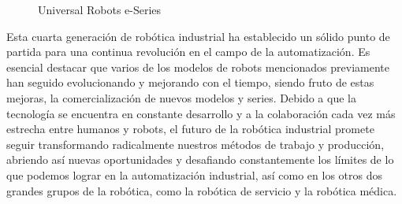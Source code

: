   \begin{figure}[H]
    \begin{center}
      \subcapcentertrue
      \hspace{2mm}
    \end{center}
    \caption{Universal Robots e-Series}
    \label{fig:UR_e-Series}
  \end{figure}

\pagebreak
Esta cuarta generación de robótica industrial ha establecido un sólido punto de partida para una continua revolución en el campo de la automatización. 
Es esencial destacar que varios de los modelos de robots mencionados previamente han seguido evolucionando y mejorando con el tiempo, siendo fruto de estas mejoras, la comercialización de nuevos modelos y series. 
Debido a que la tecnología se encuentra en constante desarrollo y a la colaboración cada vez más estrecha entre humanos y robots, el futuro de la robótica industrial promete seguir transformando radicalmente nuestros métodos de trabajo y producción, abriendo así nuevas oportunidades y desafiando constantemente los límites de lo que podemos lograr en la automatización industrial, así como en los otros dos grandes grupos de la robótica, como la robótica de servicio y la robótica médica.
   

